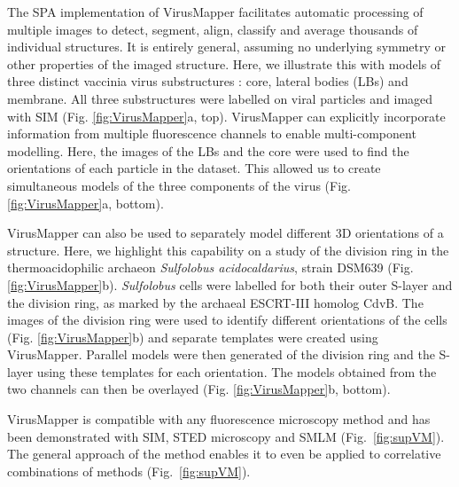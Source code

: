  The SPA implementation of VirusMapper facilitates automatic processing of multiple images to detect, segment, align, classify and average thousands of individual structures. It is entirely general, assuming no underlying symmetry or other properties of the imaged structure. Here, we illustrate this with models of three distinct vaccinia virus substructures \cite{moss2013poxviridae}: core, lateral bodies (LBs) and membrane. All three substructures were labelled on viral particles and imaged with SIM (Fig. \ref{fig:VirusMapper}a, top). VirusMapper can explicitly incorporate information from multiple fluorescence channels to enable multi-component modelling. Here, the images of the LBs and the core were used to find the orientations of each particle in the dataset. This allowed us to create simultaneous models of the three components of the virus (Fig. \ref{fig:VirusMapper}a, bottom).

 VirusMapper can also be used to separately model different 3D orientations of a structure. Here, we highlight this capability on a study of the division ring in the thermoacidophilic archaeon \emph{Sulfolobus acidocaldarius}, strain DSM639 (Fig. \ref{fig:VirusMapper}b). \emph{Sulfolobus} cells were labelled for both their outer S-layer and the division ring, as marked by the archaeal ESCRT-III homolog CdvB. The images of the division ring were used to identify different orientations of the cells (Fig. \ref{fig:VirusMapper}b) and separate templates were created using VirusMapper. Parallel models were then generated of the division ring and the S-layer using these templates for each orientation. The models obtained from the two channels can then be overlayed (Fig. \ref{fig:VirusMapper}b, bottom).
 
 VirusMapper is compatible with any fluorescence microscopy method and has been demonstrated with SIM, STED microscopy \cite{gray2016virusmapper} and SMLM (Fig.~\ref{fig:supVM}). The general approach of the method enables it to even be applied to correlative combinations of methods (Fig.~\ref{fig:supVM}).

